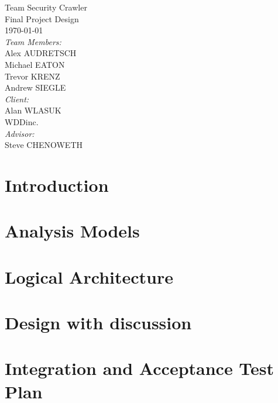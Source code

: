 \documentclass{article}
\begin{document}
\fancyhf{}
\rhead{\today}

\begin{titlepage}
\begin{center}
{\huge Team Security Crawler}\\[2cm]
{\Large Final Project Design}\\[2cm]
{\large \today}\\[2cm]
\emph{Team Members:}\\
Alex \uppercase{Audretsch}\\
Michael \uppercase{Eaton}\\
Trevor \uppercase{Krenz}\\
Andrew \uppercase{Siegle}\\[1cm]
\emph{Client:}\\
Alan WLASUK\\
WDDinc.\\[1cm]
\emph{Advisor:}\\
Steve CHENOWETH

\end{center}
\end{titlepage}
\tableofcontents
\newpage

\section{Introduction}
\newpage
\section{Analysis Models}
\newpage
\section{Logical Architecture}
\newpage
\section{Design with discussion}
\newpage
\section{Integration and Acceptance Test Plan}
\newpage
\end{document}
